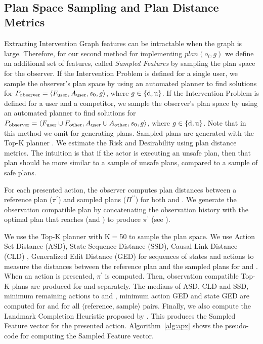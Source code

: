 ~\subsection{Plan Space Sampling and Plan Distance Metrics}
\label{sec:planspacesampling}
Extracting Intervention Graph features can be intractable when the graph is large.
Therefore, for our second method for implementing $plan(o_i,g)$ we define an additional set of features, called \textit{Sampled Features} by sampling the plan space for the observer.
If the Intervention Problem is defined for a single user, we sample the observer's plan space by using an automated planner to find solutions for $P_{\textnormal{observer}}=\langle F_{\textnormal{user}},A_{\textnormal{user}}, s_0, g\rangle$, where $g\in\lbrace \mathrm{d},\mathrm{u} \rbrace$.
If the Intervention Problem is defined for a user and a competitor, we sample the observer's plan space by using an automated planner to find solutions for $P_{\textnormal{observer}}=\langle F_{\textnormal{user}} \cup F_{\textnormal{other}},A_{\textnormal{user}}\cup A_{\textnormal{other}}, s_0, g\rangle$, where $g\in\lbrace \mathrm{d},\mathrm{u} \rbrace$. 
Note that in this method we omit \dandu for generating plans.
Sampled plans are generated with the Top-K planner \cite{riabov2014}. 
We estimate the Risk and Desirability using plan distance metrics. The intuition is that if the actor is executing an unsafe plan, then that plan should be more similar to a sample of unsafe plans, compared to a sample of safe plans. 


For each presented action, the observer computes plan distances between a reference plan ($\pi^\prime$) and sampled plans ($\Pi^{\prime\prime}$) for both \undesired and \desired.
We generate the observation compatible plan by concatenating the observation history with the optimal plan that reaches \undesired (and \desired) to produce $\pi^\prime$ (see \cite{vered2017}).
 
We use the Top-K planner with K$=$50 to sample the plan space.
We use Action Set Distance (ASD), State Sequence Distance (SSD), Causal Link Distance (CLD) \cite{nguyen2012generating}, Generalized Edit Distance (GED) for sequences of states and actions \cite{sohrabi2016finding} to measure the distances between the reference plan and the sampled plans for \desired and \undesired. When an action is presented, $\pi^\prime$ is computed. 
Then, observation compatible Top-K plans are produced for \undesired and \desired separately. 
The medians of ASD, CLD and SSD, minimum remaining actions to \undesired and \desired, minimum action GED and state GED are computed for \undesired and \desired for all $\langle$reference, sample$\rangle$ pairs. 
Finally, we also compute the Landmark Completion Heuristic proposed by \cite{pereira2017}.
This produces the Sampled Feature vector for the presented action. Algorithm~\ref{alg:apx} shows the pseudo-code for computing the Sampled Feature vector.


